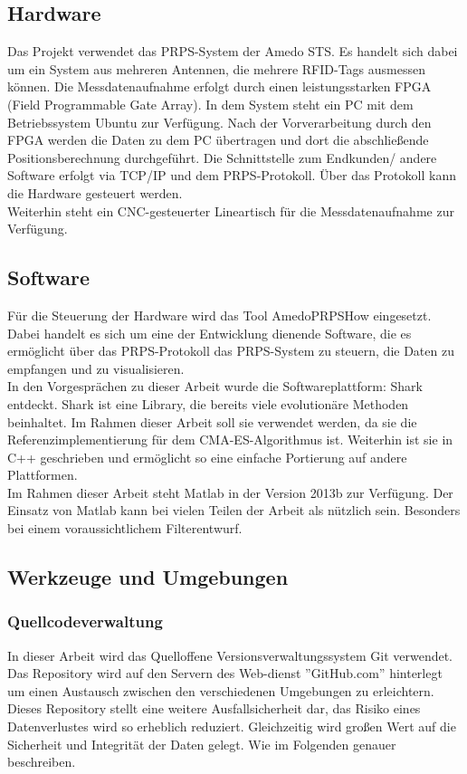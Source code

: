 \documentclass[a4paper,12pt,fleqn]{article}
\begin{document}
\subsection{Hardware}
Das Projekt verwendet das PRPS-System der Amedo STS. Es handelt sich dabei um ein System aus mehreren Antennen, die mehrere RFID-Tags ausmessen können. Die Messdatenaufnahme erfolgt durch einen leistungsstarken FPGA (Field Programmable Gate Array). In dem System steht ein PC mit dem Betriebssystem Ubuntu zur Verfügung. Nach der Vorverarbeitung durch den FPGA werden die Daten zu dem PC übertragen und dort die abschließende Positionsberechnung durchgeführt. Die Schnittstelle zum Endkunden/ andere Software erfolgt via TCP/IP und dem PRPS-Protokoll. Über das Protokoll kann die Hardware gesteuert werden.\\
Weiterhin steht ein CNC-gesteuerter Lineartisch für die Messdatenaufnahme zur Verfügung.


\subsection{Software}
Für die Steuerung der Hardware wird das Tool AmedoPRPSHow eingesetzt. Dabei handelt es sich um eine der Entwicklung dienende Software, die es ermöglicht über das PRPS-Protokoll das PRPS-System zu steuern, die Daten zu empfangen und zu visualisieren.\\
In den Vorgesprächen zu dieser Arbeit wurde die Softwareplattform: Shark entdeckt. Shark ist eine Library, die bereits viele evolutionäre Methoden beinhaltet. Im Rahmen dieser Arbeit soll sie verwendet werden, da sie die Referenzimplementierung für dem CMA-ES-Algorithmus ist. Weiterhin ist sie in C++ geschrieben und ermöglicht so eine einfache Portierung auf andere Plattformen.\\
Im Rahmen dieser Arbeit steht Matlab in der Version 2013b zur Verfügung. Der Einsatz von Matlab kann bei vielen Teilen der Arbeit als nützlich sein. Besonders bei einem voraussichtlichem Filterentwurf.  


\subsection{Werkzeuge und Umgebungen}
\subsubsection{Quellcodeverwaltung}
In dieser Arbeit wird das Quelloffene Versionsverwaltungssystem Git verwendet.
Das Repository wird auf den Servern des Web-dienst ''GitHub.com'' hinterlegt um
einen Austausch zwischen den verschiedenen Umgebungen zu erleichtern. Dieses
Repository stellt eine weitere Ausfallsicherheit dar, das Risiko eines
Datenverlustes wird so erheblich reduziert. Gleichzeitig wird großen Wert auf
die Sicherheit und Integrität der Daten gelegt. Wie im Folgenden
genauer beschreiben.
\end{document}

